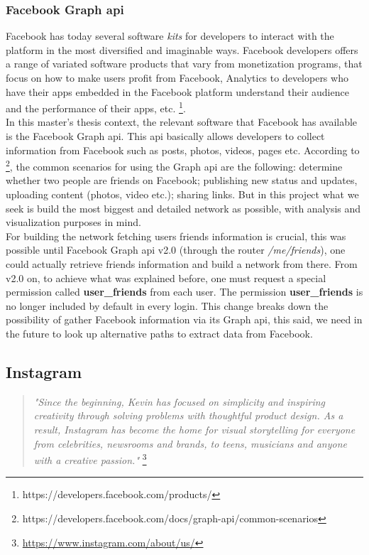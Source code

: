 \subsubsection*{Facebook Graph \gls{api}}
Facebook has today several software \textit{kits} for developers to interact with the platform in the most diversified and imaginable ways. Facebook developers
offers a range of variated software products that vary from monetization programs, that focus on how to make users profit from Facebook, Analytics to developers who
have their apps embedded in the Facebook platform understand their audience and the performance of their apps, etc. \footnote{https://developers.facebook.com/products/}.\\
\indent In this master's thesis context, the relevant software that Facebook has available is the Facebook Graph \gls{api}. This \gls{api} basically allows developers to collect information
from Facebook such as posts, photos, videos, pages etc. According to \footnote{https://developers.facebook.com/docs/graph-api/common-scenarios}, the common scenarios for using the Graph \gls{api}
are the following: determine whether two people are friends on Facebook; publishing new status and updates, uploading content (photos, video etc.); sharing links. But in this project what we seek is
build the most biggest and detailed network as possible, with analysis and visualization purposes in mind.\\
\indent For building the network fetching users friends information is crucial, this was possible until Facebook Graph \gls{api} v2.0 (through the router \textit{/me/friends}), one could actually retrieve
friends information and build a network from there. From v2.0 on, to achieve what was explained before, one must request a special permission called \textbf{user\_friends}
from each user. The permission \textbf{user\_friends} is no longer included by default in every login. This change breaks down the possibility of gather Facebook information via its Graph \gls{api},
this said, we need in the future to look up alternative paths to extract data from Facebook.


\subsection{Instagram}

\begin{quote}
\textit{"Since the beginning, Kevin has focused on simplicity and inspiring creativity through solving problems with thoughtful
product design. As a result, Instagram has become the home for visual storytelling for everyone from celebrities, newsrooms and
brands, to teens, musicians and anyone with a creative passion."} \footnote{\url{https://www.instagram.com/about/us/}}
\end{quote}

